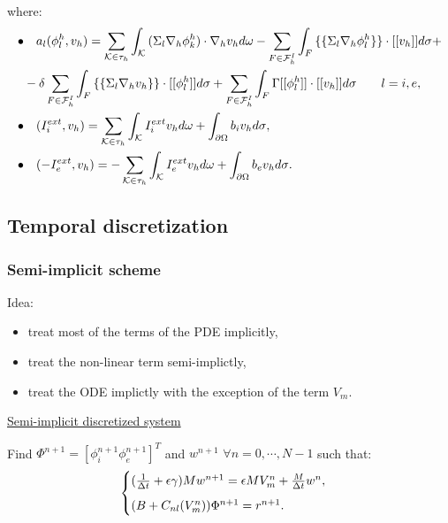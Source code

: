 \documentclass[9pt]{beamer}
\begin{document}
\begin{frame}
    where:
\center
    \begin{equation*}
    \begin{aligned}
    \bullet& \quad a_l(\phi_l^h,v_h)=\sum_{\mathcal{K} \in \tau_h} \int_{\mathcal{K}}{(\Sigma_l \nabla_h \phi_k^h) \cdot \nabla_h v_h d\omega}-\sum_{F \in \mathcal{F}_h^I} \int_F { \{\{\Sigma_l \nabla_h \phi_l^h \}\} \cdot [[v_h]] d\sigma}+\\
    &-\delta \sum_{F \in \mathcal{F}_h^I} \int_F{ \{\{\Sigma_l \nabla_h v_h\}\} \cdot [[\phi_l^h]]d\sigma}+\sum_{F \in \mathcal{F}_h^I}\int_F {\Gamma [[\phi_l^h]] \cdot [[v_h]] d\sigma} \qquad l=i,e,\\
    \newline
    \bullet& \quad (I_i^{ext},v_h)=\sum_{\mathcal{K} \in \tau_h} \int_{\mathcal{K}} {I_i^{ext} v_h d\omega}+\int_{\partial \Omega}{b_i v_h d\sigma},\\
    \newline
    \bullet& \quad (-I_e^{ext},v_h)=-\sum_{\mathcal{K} \in \tau_h} \int_{\mathcal{K}} {I_e^{ext} v_h d\omega}+\int_{\partial \Omega}{b_e v_h d\sigma}.
    \end{aligned}
    \end{equation*}
\end{frame}

\begin{frame}
\section{Temporal discretization}
\frametitle{Semi-implicit scheme}
Idea:
\begin{itemize}
\item treat most of the terms of the PDE implicitly,
\item treat the non-linear term semi-implictly,
\item treat the ODE implictly with the exception of the term $V_m$.
\end{itemize}
\vspace{3mm}
\begin{center}
\underline{Semi-implicit discretized system}
\end{center}
Find $\Phi^{n+1}=[\phi_i^{n+1} \phi_e^{n+1}]^T$ and $w^{n+1}$ $\forall n=0,\cdots,N-1$ such that:
\begin{equation*}
\begin{cases}
(\frac{1}{\Delta t}+\epsilon \gamma)M w^{n+1}=\epsilon M V_m^n+\frac{M}{\Delta t} w^n, \vspace{2mm} \\
(B+C_{nl}(V_m^n)) \Phi^{n+1}=r^{n+1}.
\end{cases}
\end{equation*} 
\end{frame}
\end{document}
